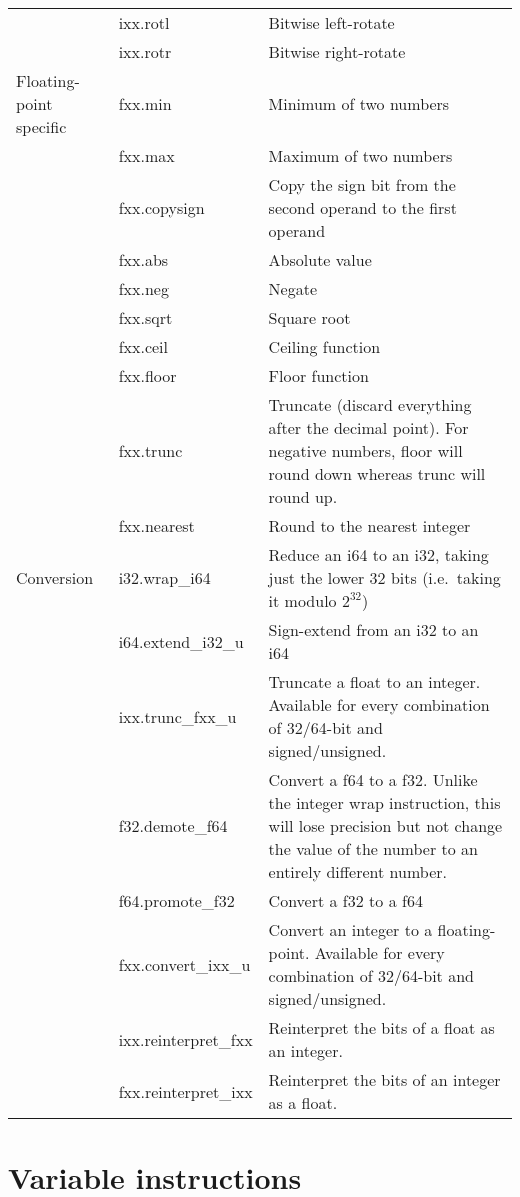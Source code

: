 \documentclass[10pt,a4paper]{article}
\begin{document}
\begin{xltabular}{\textwidth}{l>{\sffamily}lX}
& ixx.rotl & Bitwise left-rotate \\
& ixx.rotr & Bitwise right-rotate \\
\midrule
Floating-point specific
& fxx.min & Minimum of two numbers \\
& fxx.max & Maximum of two numbers \\
& fxx.copysign & Copy the sign bit from the second operand to the first operand \\
& fxx.abs & Absolute value \\
& fxx.neg & Negate \\
& fxx.sqrt & Square root \\
& fxx.ceil & Ceiling function \\
& fxx.floor & Floor function \\
& fxx.trunc & Truncate (discard everything after the decimal point). For negative numbers, \textsf{floor} will round down whereas \textsf{trunc} will round up. \\
& fxx.nearest & Round to the nearest integer \\
\midrule
Conversion
& i32.wrap\_i64 & Reduce an \textsf{i64} to an \textsf{i32}, taking just the lower 32 bits (i.e.\ taking it modulo $2^{32}$) \\
& i64.extend\_i32\_u & Sign-extend from an \textsf{i32} to an \textsf{i64} \\
& ixx.trunc\_fxx\_u & Truncate a float to an integer. Available for every combination of 32/64-bit and signed/unsigned. \\
& f32.demote\_f64 & Convert a \textsf{f64} to a \textsf{f32}. Unlike the integer wrap instruction, this will lose precision but not change the value of the number to an entirely different number. \\
& f64.promote\_f32 & Convert a \textsf{f32} to a \textsf{f64} \\
& fxx.convert\_ixx\_u & Convert an integer to a floating-point. Available for every combination of 32/64-bit and signed/unsigned. \\
& ixx.reinterpret\_fxx & Reinterpret the bits of a float as an integer. \\
& fxx.reinterpret\_ixx & Reinterpret the bits of an integer as a float. \\
\bottomrule
\end{xltabular}

\section*{Variable instructions}
\end{document}
